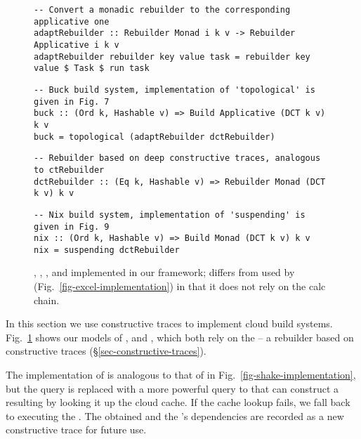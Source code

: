 \begin{figure}
\begin{verbatim}
\end{verbatim}
\vspace{1mm}
\begin{verbatim}
-- Convert a monadic rebuilder to the corresponding applicative one
adaptRebuilder :: Rebuilder Monad i k v -> Rebuilder Applicative i k v
adaptRebuilder rebuilder key value task = rebuilder key value $ Task $ run task
\end{verbatim}
\vspace{1mm}
\begin{verbatim}
-- Buck build system, implementation of 'topological' is given in Fig. 7
buck :: (Ord k, Hashable v) => Build Applicative (DCT k v) k v
buck = topological (adaptRebuilder dctRebuilder)
\end{verbatim}
\vspace{1mm}
\begin{verbatim}
-- Rebuilder based on deep constructive traces, analogous to ctRebuilder
dctRebuilder :: (Eq k, Hashable v) => Rebuilder Monad (DCT k v) k v
\end{verbatim}
\vspace{1mm}
\begin{verbatim}
-- Nix build system, implementation of 'suspending' is given in Fig. 9
nix :: (Ord k, Hashable v) => Build Monad (DCT k v) k v
nix = suspending dctRebuilder
\end{verbatim}
\vspace{-2mm}
\caption{\Bazel, \Cloud \Shake, \CloudBuild, \Buck and \Nix implemented in
our framework;  differs from  used by \Excel
(Fig.~\ref{fig-excel-implementation}) in that it does not rely on the calc
chain.}
\label{fig-cloud-implementations}
\vspace{-4mm}
\end{figure}

In this section we use constructive traces to implement cloud build systems.
Fig.~\ref{fig-cloud-implementations} shows our models of \Bazel,
\CloudBuild and \Cloud \Shake, which both rely on the  -- a
rebuilder based on constructive traces (\S\ref{sec-constructive-traces}).

The implementation of  is analogous to that of 
in Fig.~\ref{fig-shake-implementation}, but the  query is replaced
with a more powerful query to  that can construct a resulting
 by looking it up the cloud cache. If the cache lookup fails, we
fall back to executing the . The obtained  and the
's dependencies are recorded as a new constructive trace for future
use.

